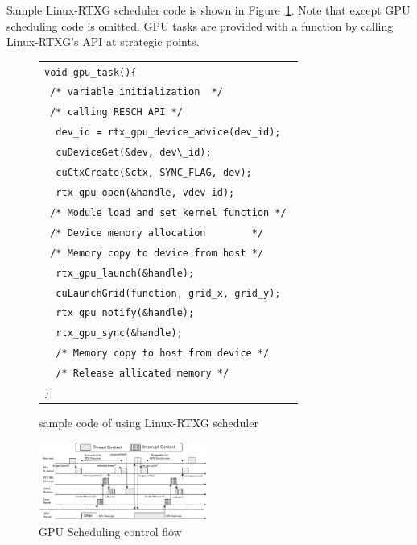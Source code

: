 Sample Linux-RTXG scheduler code is shown in Figure~\ref{fig:sample}.
Note that except GPU scheduling code is omitted.
GPU tasks are provided with a function by calling Linux-RTXG’s API at strategic points.

\begin{figure}[t]
\begin{center}
\begin{tabular}{l}
\hline\hline
{\scriptsize \verb|void gpu_task(){        |}\\
{\scriptsize \verb| /* variable initialization  */        |}\\
{\scriptsize \verb| /* calling RESCH API */        |}\\
{\scriptsize \verb|  dev_id = rtx_gpu_device_advice(dev_id); |}\\
{\scriptsize \verb|  cuDeviceGet(&dev, dev\_id);           |}\\
{\scriptsize \verb|  cuCtxCreate(&ctx, SYNC_FLAG, dev);    |}\\
{\scriptsize \verb|  rtx_gpu_open(&handle, vdev_id);     |}\\
{\scriptsize \verb| /* Module load and set kernel function */ |}\\
{\scriptsize \verb| /* Device memory allocation        */ |}\\
{\scriptsize \verb| /* Memory copy to device from host */ |}\\
{\scriptsize \verb|  rtx_gpu_launch(&handle); |}\\
{\scriptsize \verb|  cuLaunchGrid(function, grid_x, grid_y); |}\\
{\scriptsize \verb|  rtx_gpu_notify(&handle); |}\\
{\scriptsize \verb|  rtx_gpu_sync(&handle);   |}\\
{\scriptsize \verb|  /* Memory copy to host from device */  |}\\
{\scriptsize \verb|  /* Release allicated memory */  |}\\
{\scriptsize \verb|}|}\\
\hline\hline
\end{tabular}
\caption{sample code of using Linux-RTXG scheduler}
\label{fig:sample}
\end{center}
\end{figure}

\begin{figure}[t]
\begin{center}
\includegraphics[width=0.5\textwidth]{img/gsched_controlflow.pdf}
\caption{GPU Scheduling control flow}
\label{fig:controlflow}
\end{center}
\end{figure}

